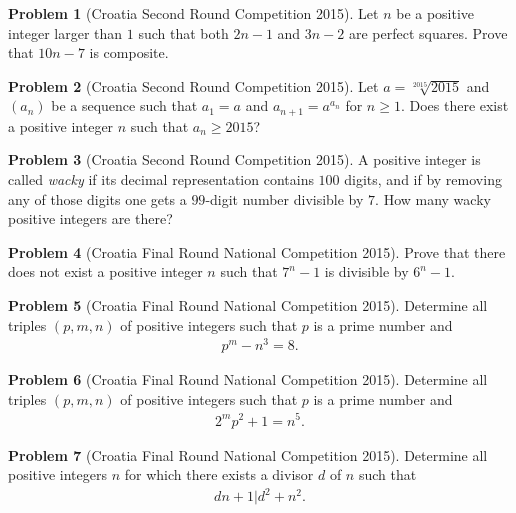\documentclass[]{article}
\theoremstyle{definition}
\newtheorem{problem}{Problem}
\begin{document}
\begin{problem}[Croatia Second Round Competition 2015]
	Let $n$ be a positive integer larger than $1$ such that both $2n - 1$ and $3n - 2$ are perfect squares. Prove that $10n - 7$ is composite.
\end{problem}


\begin{problem}[Croatia Second Round Competition 2015]
	Let $a = \sqrt[2015]{2015}$ and $(a_n)$ be a sequence such that $a_1 = a$ and $a_{n+1} = a^{a_n}$ for $n \geq 1$. Does there exist a positive integer $n$ such that $a_n \geq 2015$?
\end{problem}


\begin{problem}[Croatia Second Round Competition 2015]
	A positive integer is called \textit{wacky} if its decimal representation contains $100$ digits, and if by removing any of those digits one gets a $99$-digit number divisible by $7$. How many wacky positive integers are there?
\end{problem}


\begin{problem}[Croatia Final Round National Competition 2015]
	Prove that there does not exist a positive integer $n$ such that $7^n - 1$ is divisible by $6^n - 1$.
\end{problem}


\begin{problem}[Croatia Final Round National Competition 2015]
	Determine all triples $(p, m, n)$ of positive integers such that $p$ is a prime number and
		\begin{align*}
			p^m - n^3 =8.
		\end{align*}
\end{problem}



\begin{problem}[Croatia Final Round National Competition 2015]
	Determine all triples $(p, m, n)$ of positive integers such that $p$ is a prime number and
		\begin{align*}
			2^mp^2+1 = n^5.
		\end{align*}
\end{problem}


\begin{problem}[Croatia Final Round National Competition 2015]
	Determine all positive integers $n$ for which there exists a divisor $d$ of $n$ such that
		\begin{align*}
			dn + 1 | d^2 + n^2.
		\end{align*}
\end{problem}
\end{document}

